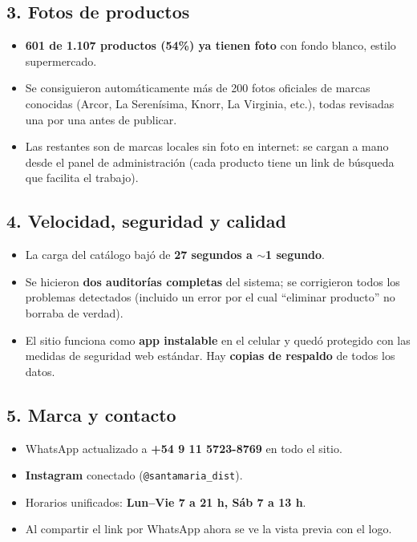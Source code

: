 \documentclass[a4paper,11pt]{article}
\begin{document}
\subsection*{3. Fotos de productos}
\begin{itemize}[leftmargin=1.2em, itemsep=2pt]
  \item \textbf{601 de 1.107 productos (54\%) ya tienen foto} con fondo blanco, estilo supermercado.
  \item Se consiguieron autom\'aticamente m\'as de 200 fotos oficiales de marcas conocidas (Arcor, La Seren\'isima, Knorr, La Virginia, etc.), todas revisadas una por una antes de publicar.
  \item Las restantes son de marcas locales sin foto en internet: se cargan a mano desde el panel de administraci\'on (cada producto tiene un link de b\'usqueda que facilita el trabajo).
\end{itemize}

\subsection*{4. Velocidad, seguridad y calidad}
\begin{itemize}[leftmargin=1.2em, itemsep=2pt]
  \item La carga del cat\'alogo baj\'o de \textbf{27 segundos a $\sim$1 segundo}.
  \item Se hicieron \textbf{dos auditor\'ias completas} del sistema; se corrigieron todos los problemas detectados (incluido un error por el cual ``eliminar producto'' no borraba de verdad).
  \item El sitio funciona como \textbf{app instalable} en el celular y qued\'o protegido con las medidas de seguridad web est\'andar. Hay \textbf{copias de respaldo} de todos los datos.
\end{itemize}

\subsection*{5. Marca y contacto}
\begin{itemize}[leftmargin=1.2em, itemsep=2pt]
  \item WhatsApp actualizado a \textbf{+54 9 11 5723-8769} en todo el sitio.
  \item \textbf{Instagram} conectado (\texttt{@santamaria\_dist}).
  \item Horarios unificados: \textbf{Lun--Vie 7 a 21 h, S\'ab 7 a 13 h}.
  \item Al compartir el link por WhatsApp ahora se ve la vista previa con el logo.
\end{itemize}
\end{document}
